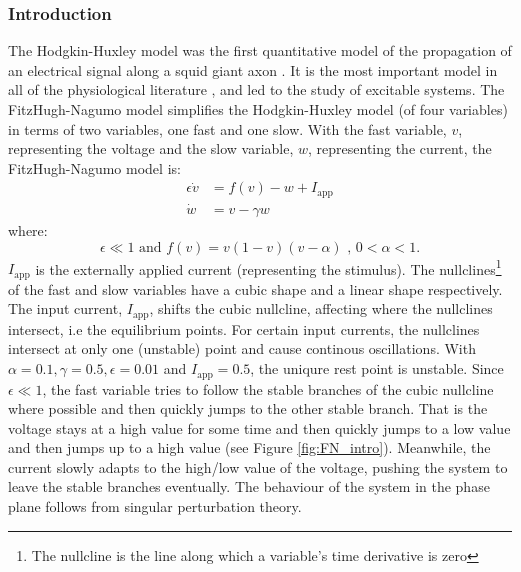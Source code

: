 \documentclass[a4paper, 12pt]{article}
\begin{document}
\subsubsection{Introduction}
The Hodgkin-Huxley model was the first quantitative model of the propagation of an electrical signal along a squid giant axon \cite{keener}. It is the most important model in all of the physiological literature \cite{keener}, and led to the study of excitable systems.  The FitzHugh-Nagumo model simplifies the Hodgkin-Huxley model (of four variables) in terms of two variables, one fast and one slow. With the fast variable, $v$, representing the voltage and the slow variable, $w$, representing the current, the FitzHugh-Nagumo model is:
\begin{align}
\epsilon\dot{v} &= f(v) - w + I_\text{app}\\
\dot{w} &= v - \gamma w
\end{align}
where: 
\begin{equation*}
\epsilon \ll 1 \text{  and  } f(v) = v(1-v)(v-\alpha) \text{ , } 0 <\alpha<1 .
\end{equation*} 
$I_\text{app}$ is the externally applied current (representing the stimulus). The nullclines\footnote{The nullcline is the line along which a variable's time derivative is zero} of the fast and slow variables have a cubic shape and a linear shape respectively.   The input current, $I_\text{app}$, shifts the cubic nullcline, affecting where the nullclines intersect, i.e the equilibrium points. For certain input currents, the nullclines intersect at only one (unstable) point and cause continous oscillations. With $\alpha =0.1, \gamma = 0.5, \epsilon = 0.01$ and $I_{\text{app}}=0.5$, the uniqure rest point is unstable. Since $\epsilon \ll 1 $, the fast variable tries to follow the stable branches of the cubic nullcline where possible and then quickly jumps to the other stable branch. That is the voltage stays at a high value for some time and then quickly jumps to a low value and then jumps up to a high value (see Figure \ref{fig:FN_intro}).  Meanwhile, the current slowly adapts to the high/low value of the voltage, pushing the system to leave the stable branches eventually. The behaviour of the system in the phase plane follows from singular perturbation theory\cite{keener}. 
\end{document}

